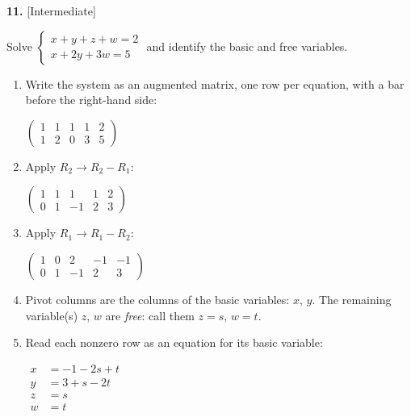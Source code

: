\documentclass[11pt]{article}
\begin{document}
\begin{minipage}{\linewidth}\textbf{11.} \hfill{\scriptsize\color{ink}[Intermediate]}\par\nopagebreak Solve $\begin{cases}x+y+z+w=2\\ x+2y+3w=5\end{cases}$ and identify the basic and free variables.
\end{minipage}\par\nopagebreak
\begin{tcolorbox}[breakable,colback=ans,colframe=ansb,boxrule=0.5pt,left=4pt,right=4pt,top=2pt,bottom=2pt]\begin{enumerate}[leftmargin=2.2em,itemsep=1pt,topsep=1pt,label=\textbf{Step \arabic*.}]\item Write the system as an augmented matrix, one row per equation, with a bar before the right-hand side:\par\smallskip $\displaystyle \left(\begin{array}{cccc|c}1 & 1 & 1 & 1 & 2 \\ 1 & 2 & 0 & 3 & 5\end{array}\right)$
\item Apply $R_2\to R_2-R_1$:\par\smallskip $\displaystyle \left(\begin{array}{cccc|c}1 & 1 & 1 & 1 & 2 \\ 0 & 1 & -1 & 2 & 3\end{array}\right)$
\item Apply $R_1\to R_1-R_2$:\par\smallskip $\displaystyle \left(\begin{array}{cccc|c}1 & 0 & 2 & -1 & -1 \\ 0 & 1 & -1 & 2 & 3\end{array}\right)$
\item Pivot columns are the columns of the basic variables: $x$, $y$. The remaining variable(s) $z$, $w$ are \emph{free}: call them $z=s$, $w=t$.
\item Read each nonzero row as an equation for its basic variable:\par\smallskip $\displaystyle\begin{aligned}x&=-1-2s+t\\ y&=3+s-2t\\ z&=s\\ w&=t\end{aligned}$

\end{enumerate}
\end{tcolorbox}
\end{document}
